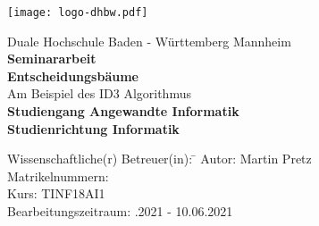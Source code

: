 \begin{titlepage}
    \begin{minipage}{\textwidth}
        \vspace{-2cm}
        \texttt{[image: logo-dhbw.pdf]}
    \end{minipage}
    \vspace{1em}

    \begin{center}
		{\textsf{\large Duale Hochschule Baden - W\"urttemberg Mannheim}}\\[4em]
		{\textsf{\textbf{\large{Seminararbeit}}}}\\[6mm]                                 %
		{\textsf{\textbf{\Large{Entscheidungsbäume}}}} \\[0.5cm]                        %
		{\textsf{Am Beispiel des ID3 Algorithmus}} \\[1.5cm]
		{\textsf{\textbf{\large{Studiengang Angewandte Informatik}}}}\\[6mm]
		{\textsf{\textbf{Studienrichtung Informatik}}}\vspace{12em}
		\begin{minipage}{\textwidth}
			\begin{tabbing}
				Wissenschaftliche(r) Betreuer(in): \hspace{0.85cm}\=\kill
				Autor: \> Martin Pretz \\[1.5mm]
				Matrikelnummern:  \\[1.5mm]
				Kurs: \> TINF18AI1 \\[1.5mm]
				Bearbeitungszeitraum: .2021 - 10.06.2021 \\[1.5mm]
			\end{tabbing}
		\end{minipage}
	\end{center}
\end{titlepage}